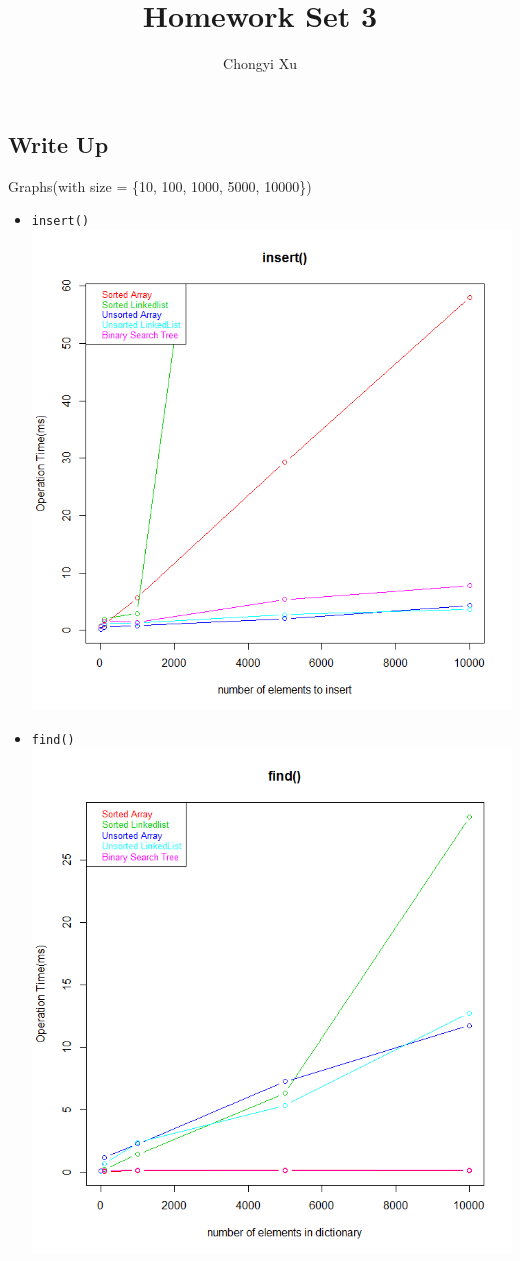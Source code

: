 \documentclass[]{exam}
\title{}
\title{Homework Set 3}
\author{Chongyi Xu}
\begin{document}
	
\maketitle

\begin{questions}
	\section*{Write Up}
	\question Graphs(with size = \{10, 100, 1000, 5000, 10000\})
	\begin{itemize}
		\item \verb|insert()|\\
			\includegraphics[scale = 0.5]{insert.png}
		\item \verb|find()|\\
			\includegraphics[scale = 0.5]{find.png}

\end{itemize}
\end{questions}
\end{document}
